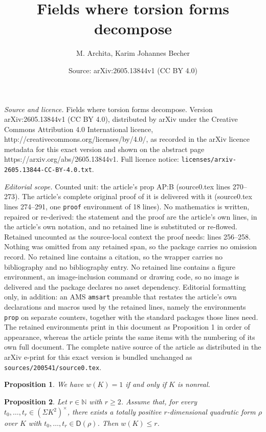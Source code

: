 \documentclass[10pt,a4paper]{amsart}
\title{Fields where torsion forms decompose}
\author{M. Archita, Karim Johannes Becher}
\date{Source: arXiv:2605.13844v1 (CC BY 4.0)}
\newtheorem{prop}{Proposition}
\newcommand{\D}{\mathsf{D}}
\renewcommand{\geq}{\geqslant}
\renewcommand{\leq}{\leqslant}
\newcommand{\mg}[1]{{#1}^{\times}}
\newcommand{\nat}{\mathbb{N}}
\begin{document}
\maketitle

\noindent\emph{Source and licence.} Fields where torsion forms decompose. Version arXiv:2605.13844v1 (CC BY 4.0), distributed by arXiv under the Creative Commons Attribution 4.0 International licence, http://creativecommons.org/licenses/by/4.0/, as recorded in the arXiv licence metadata for this exact version and shown on the abstract page https://arxiv.org/abs/2605.13844v1. Full licence notice: \texttt{licenses/arxiv-2605.13844-CC-BY-4.0.txt}.\par\smallskip

\noindent\textit{Editorial scope.} Counted unit: the article's prop AP:B (source0.tex lines 270--273). The article's complete original proof of it is delivered with it (source0.tex lines 274--291, one \texttt{proof} environment of 18 lines). No mathematics is written, repaired or re-derived: the statement and the proof are the article's own lines, in the article's own notation, and no retained line is substituted or re-flowed.  Retained uncounted as the source-local context the proof needs: lines 256--258.  Nothing was omitted from any retained span, so the package carries no omission record.  No retained line contains a citation, so the wrapper carries no bibliography and no bibliography entry.  No retained line contains a figure environment, an image-inclusion command or drawing code, so no image is delivered and the package declares no asset dependency.  Editorial formatting only, in addition: an AMS \texttt{amsart} preamble that restates the article's own declarations and macros used by the retained lines, namely the environments \texttt{prop} on separate counters, together with the standard packages those lines need.  The retained environments print in this document as Proposition 1 in order of appearance, whereas the article prints the same items with the numbering of its own full document.  The complete native source of the article as distributed in the arXiv e-print for this exact version is bundled unchanged as \texttt{sources/200541/source0.tex}.
\begin{prop}\label{nr}
We have $w(K)=1$ if and only if $K$ is nonreal.
\end{prop}

\begin{prop}\label{AP:B}
        Let $r\in\nat$ with $r\geq 2$. Assume that, for every $t_0,\dots,t_r\in\mg{(\mathsf{\Sigma}K^2)}$, there exists a totally positive $r$-dimensional quadratic form $\rho$ over $K$ with $t_0,\dots,t_r\in\D(\rho)$.
    Then $w(K)\leq r$.
\end{prop}
\end{document}
